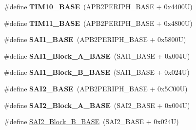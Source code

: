\begin{DoxyCompactItemize}
\item 
\mbox{\label{group___peripheral__memory__map_ga3eff32f3801db31fb4b61d5618cad54a}} 
\#define {\bfseries T\+I\+M10\+\_\+\+B\+A\+SE}~(A\+P\+B2\+P\+E\+R\+I\+P\+H\+\_\+\+B\+A\+SE + 0x4400\+U)
\item 
\mbox{\label{group___peripheral__memory__map_ga3a4a06bb84c703084f0509e105ffaf1d}} 
\#define {\bfseries T\+I\+M11\+\_\+\+B\+A\+SE}~(A\+P\+B2\+P\+E\+R\+I\+P\+H\+\_\+\+B\+A\+SE + 0x4800\+U)
\item 
\mbox{\label{group___peripheral__memory__map_ga24c1053b754946b512f9c31123e09d21}} 
\#define {\bfseries S\+A\+I1\+\_\+\+B\+A\+SE}~(A\+P\+B2\+P\+E\+R\+I\+P\+H\+\_\+\+B\+A\+SE + 0x5800\+U)
\item 
\mbox{\label{group___peripheral__memory__map_ga31f72e5e5d7aea23bc8a5191bc32e900}} 
\#define {\bfseries S\+A\+I1\+\_\+\+Block\+\_\+\+A\+\_\+\+B\+A\+SE}~(S\+A\+I1\+\_\+\+B\+A\+SE + 0x004\+U)
\item 
\mbox{\label{group___peripheral__memory__map_gacdb59b321830def8c7a57c154178bc48}} 
\#define {\bfseries S\+A\+I1\+\_\+\+Block\+\_\+\+B\+\_\+\+B\+A\+SE}~(S\+A\+I1\+\_\+\+B\+A\+SE + 0x024\+U)
\item 
\mbox{\label{group___peripheral__memory__map_ga4b4d5c95ea5f835f9ac37fab90a2d700}} 
\#define {\bfseries S\+A\+I2\+\_\+\+B\+A\+SE}~(A\+P\+B2\+P\+E\+R\+I\+P\+H\+\_\+\+B\+A\+SE + 0x5\+C00\+U)
\item 
\mbox{\label{group___peripheral__memory__map_gad2992b5770984ddee4c1b7e325d238f3}} 
\#define {\bfseries S\+A\+I2\+\_\+\+Block\+\_\+\+A\+\_\+\+B\+A\+SE}~(S\+A\+I2\+\_\+\+B\+A\+SE + 0x004\+U)
\item 
\#define \mbox{\hyperlink{group___peripheral__memory__map_ga034a6ac8f61e4d15cd9f2f7eca140569}{S\+A\+I2\+\_\+\+Block\+\_\+\+B\+\_\+\+B\+A\+SE}}~(S\+A\+I2\+\_\+\+B\+A\+SE + 0x024\+U)
\item 
\mbox{\label{group___peripheral__memory__map_gad7723846cc5db8e43a44d78cf21f6efa}} 

\end{DoxyCompactItemize}
